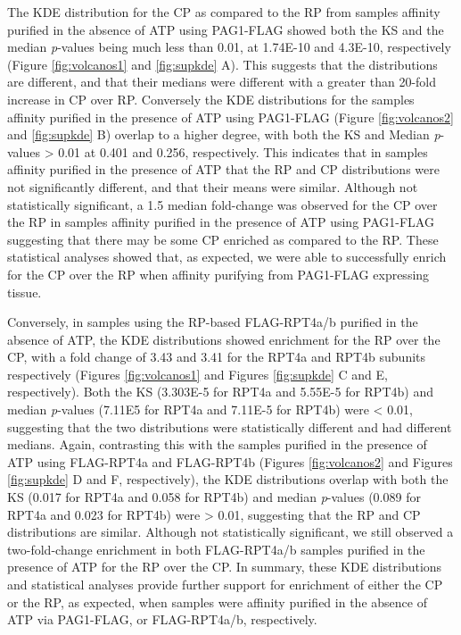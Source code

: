 The KDE distribution for the CP as compared to the RP from samples affinity purified in the absence of ATP using PAG1-FLAG showed both the KS and the median \textit{p}-values being much less than 0.01, at 1.74E-10 and 4.3E-10, respectively (Figure \ref{fig:volcanos1} and \ref{fig:supkde} A). This suggests that the distributions are different, and that their medians were different with a greater than 20-fold increase in CP over RP. Conversely the KDE distributions for the samples affinity purified in the presence of ATP using PAG1-FLAG (Figure \ref{fig:volcanos2} and \ref{fig:supkde} B) overlap to a higher degree, with both the KS and Median \textit{p}-values > 0.01 at 0.401 and 0.256, respectively. This indicates that in samples affinity purified in the presence of ATP that the RP and CP distributions were not significantly different, and that their means were similar. Although not statistically significant, a 1.5 median fold-change was observed for the CP over the RP in samples affinity purified in the presence of ATP using PAG1-FLAG suggesting that there may be some CP enriched as compared to the RP. These statistical analyses showed that, as expected, we were able to successfully enrich for the CP over the RP when affinity purifying from PAG1-FLAG expressing tissue.

	Conversely, in samples using the RP-based FLAG-RPT4a/b purified in the absence of ATP, the KDE distributions showed enrichment for the RP over the CP, with a fold change of 3.43 and 3.41 for the RPT4a and RPT4b subunits respectively (Figures \ref{fig:volcanos1} and Figures \ref{fig:supkde} C and E, respectively). Both the KS (3.303E-5 for RPT4a and 5.55E-5 for RPT4b) and median \textit{p}-values (7.11E5 for RPT4a and 7.11E-5 for RPT4b) were < 0.01, suggesting that the two distributions were statistically different and had different medians. Again, contrasting this with the samples purified in the presence of ATP using FLAG-RPT4a and FLAG-RPT4b (Figures \ref{fig:volcanos2} and Figures \ref{fig:supkde} D and F, respectively), the KDE distributions overlap with both the KS (0.017 for RPT4a and 0.058 for RPT4b) and median \textit{p}-values (0.089 for RPT4a and 0.023 for RPT4b) were > 0.01, suggesting that the RP and CP distributions are similar. Although not statistically significant, we still observed a two-fold-change enrichment in both FLAG-RPT4a/b samples purified in the presence of ATP for the RP over the CP. In summary, these KDE distributions and statistical analyses provide further support for enrichment of either the CP or the RP, as expected, when samples were affinity purified in the absence of ATP via PAG1-FLAG, or FLAG-RPT4a/b, respectively.


